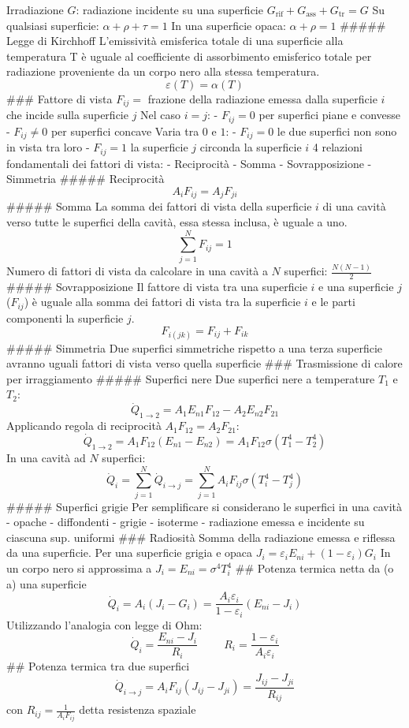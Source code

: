 Irradiazione \(G\): radiazione incidente su una superficie
\(G_\text{rif}+G_\text{ass}+G_\text{tr}=G\) Su qualsiasi superficie:
\(\alpha+\rho+\tau=1\) In una superficie opaca: \(\alpha+\rho=1\)
\#\#\#\#\# Legge di Kirchhoff L'emissività emisferica totale di una
superficie alla temperatura T è uguale al coefficiente di assorbimento
emisferico totale per radiazione proveniente da un corpo nero alla
stessa temperatura. \[\varepsilon(T)=\alpha(T)\] \#\#\# Fattore di vista
\(F_{ij}=\) frazione della radiazione emessa dalla superficie \(i\) che
incide sulla superficie \(j\) Nel caso \(i=j\): - \(F_{ij}=0\) per
superfici piane e convesse - \(F_{ij}\neq0\) per superfici concave Varia
tra \(0\) e \(1\): - \(F_{ij}=0\) le due superfici non sono in vista tra
loro - \(F_{ij}=1\) la superficie \(j\) circonda la superficie \(i\) 4
relazioni fondamentali dei fattori di vista: - Reciprocità - Somma -
Sovrapposizione - Simmetria \#\#\#\#\# Reciprocità
\[A_iF_{ij}=A_jF_{ji}\] \#\#\#\#\# Somma La somma dei fattori di vista
della superficie \(i\) di una cavità verso tutte le superfici della
cavità, essa stessa inclusa, è uguale a uno. \[\sum_{j=1}^N F_{ij}=1\]
Numero di fattori di vista da calcolare in una cavità a \(N\) superfici:
\(\frac{N(N-1)}{2}\) \#\#\#\#\# Sovrapposizione Il fattore di vista tra
una superficie \(i\) e una superficie \(j\) (\(F_{ij}\)) è uguale alla
somma dei fattori di vista tra la superficie \(i\) e le parti componenti
la superficie \(j\). \[F_{i(jk)}=F_{ij}+F_{ik}\] \#\#\#\#\# Simmetria
Due superfici simmetriche rispetto a una terza superficie avranno uguali
fattori di vista verso quella superficie \#\#\# Trasmissione di calore
per irraggiamento \#\#\#\#\# Superfici nere Due superfici nere a
temperature \(T_1\) e \(T_2\):
\[\dot Q_{1\to2}=A_1E_{n1}F_{12}-A_2E_{n2}F_{21}\] Applicando regola di
reciprocità \(A_1F_{12}=A_2F_{21}\):
\[\dot Q_{1\to2}=A_1F_{12}(E_{n1}-E_{n2})=A_1F_{12}\sigma(T_1^4-T_2^4)\]
In una cavità ad \(N\) superfici:
\[\dot Q_i=\sum_{j=1}^N \dot Q_{i\to j}=\sum_{j=1}^N A_iF_{ij}\sigma(T_i^4-T_j^4)\]
\#\#\#\#\# Superfici grigie Per semplificare si considerano le superfici
in una cavità - opache - diffondenti - grigie - isoterme - radiazione
emessa e incidente su ciascuna sup. uniformi \#\#\# Radiosità Somma
della radiazione emessa e riflessa da una superficie. Per una superficie
grigia e opaca \(J_i=\varepsilon_iE_{ni}+(1-\varepsilon_i)G_i\) In un
corpo nero si approssima a \(J_i=E_{ni}=\sigma^4T_i^4\) \#\# Potenza
termica netta da (o a) una superficie
\[\dot Q_i=A_i(J_i-G_i)=\frac{A_i\varepsilon_i}{1-\varepsilon_i}(E_{ni}-J_i)\]
Utilizzando l'analogia con legge di Ohm:
\[\dot Q_i=\frac{E_{ni}-J_i}{R_i}\hspace{1cm}R_i=\frac{1-\varepsilon_i}{A_i\varepsilon_i}\]
\#\# Potenza termica tra due superfici
\[\dot Q_{i\to j}=A_iF_{ij}(J_{ij}-J_{ji})=\frac{J_{ij}-J_{ji}}{R_{ij}}\]
con \(R_{ij}=\frac{1}{A_iF_{ij}}\) detta resistenza spaziale
